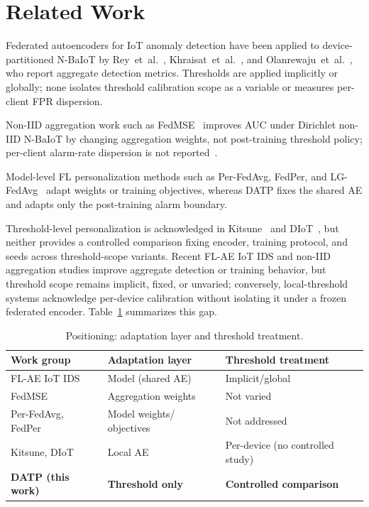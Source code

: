 \section{Related Work}
\label{sec:related}

Federated autoencoders for IoT anomaly detection have been applied to
device-partitioned N-BaIoT by Rey~et~al.~\cite{rey2022federated},
Khraisat~et~al.~\cite{khraisat2025fediot}, and
Olanrewaju~et~al.~\cite{olanrewajugeorge2025flae}, who report aggregate detection
metrics. Thresholds are applied implicitly or globally; none isolates threshold
calibration scope as a variable or measures per-client FPR dispersion.

Non-IID aggregation work such as FedMSE~\cite{nguyen2025fedmse} improves AUC under
Dirichlet non-IID N-BaIoT by changing aggregation weights, not post-training threshold
policy; per-client alarm-rate dispersion is not
reported~\cite{zhao2018noniid,li2022federated}.

Model-level FL personalization methods such as Per-FedAvg, FedPer, and
LG-FedAvg~\cite{fallah2020personalized,arivazhagan2019federated,liang2020think} adapt
weights or training objectives, whereas DATP fixes the shared AE and adapts only the
post-training alarm boundary.

Threshold-level personalization is acknowledged in
Kitsune~\cite{mirsky2018kitsune} and DIoT~\cite{nguyen2019diot}, but neither provides
a controlled comparison fixing encoder, training protocol, and seeds across
threshold-scope variants. Recent FL-AE IoT IDS and non-IID aggregation studies improve aggregate detection or training behavior, but threshold scope remains implicit, fixed, or unvaried; conversely, local-threshold systems acknowledge per-device calibration without isolating it under a frozen federated encoder. Table~\ref{tab:related_comparison} summarizes this gap.

\begin{table}[!b]
  \caption{Positioning: adaptation layer and threshold treatment.}
  \label{tab:related_comparison}
  \centering
  \footnotesize
  \renewcommand{\arraystretch}{1.2}%
  \setlength{\tabcolsep}{4pt}%
  \begin{tabular}{@{}l>{\raggedright\arraybackslash}p{2.3cm}>{\raggedright\arraybackslash}p{2.3cm}@{}}
    \toprule
    Work group & Adaptation layer & Threshold treatment \\
    \midrule
    FL-AE IoT IDS~\cite{rey2022federated,khraisat2025fediot} & Model (shared AE) & Implicit/global \\
    FedMSE~\cite{nguyen2025fedmse} & Aggregation weights & Not varied \\
    Per-FedAvg, FedPer~\cite{fallah2020personalized,arivazhagan2019federated} & Model weights/ objectives & Not addressed \\
    Kitsune, DIoT~\cite{mirsky2018kitsune,nguyen2019diot} & Local AE & Per-device (no controlled study) \\
    \textbf{DATP (this work)} & \textbf{Threshold only} & \textbf{Controlled comparison} \\
    \bottomrule
  \end{tabular}
\end{table}

